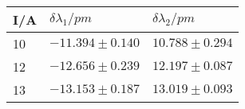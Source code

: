 \begin{tabular}{lll}
\toprule
I/A & $\delta\lambda_1/\si{pm}$ & $\delta\lambda_2/\si{pm}$ \\
\midrule
 10 &       $-11.394 \pm 0.140$ &        $10.788 \pm 0.294$ \\
 12 &       $-12.656 \pm 0.239$ &        $12.197 \pm 0.087$ \\
 13 &       $-13.153 \pm 0.187$ &        $13.019 \pm 0.093$ \\
\bottomrule
\end{tabular}
